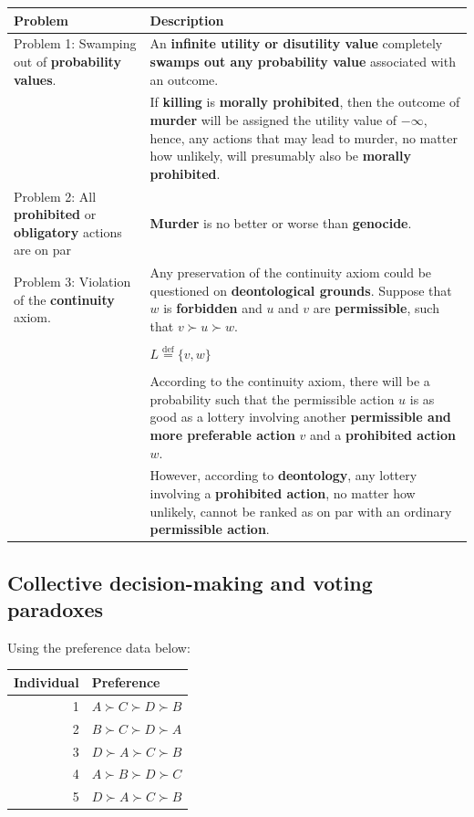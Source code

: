 \documentclass[11pt]{article}
\newcommand{\defequal}{\stackrel{\scriptscriptstyle\mathrm{def}}{=}}
\begin{document}
\begin{center}
\begin{tabular}{|m{8em}|m{30em}|}
\hline
Problem & Description\\
\hline
Problem 1: Swamping out of \textbf{probability values}. & An \textbf{infinite utility or disutility value} completely \textbf{swamps out any probability value} associated with an outcome.\\
 & If \textbf{killing} is \textbf{morally prohibited}, then the outcome of \textbf{murder} will be assigned the utility value of \(-\infty\), hence, any actions that may lead to murder, no matter how unlikely, will presumably also be \textbf{morally prohibited}.\\
\hline
Problem 2: All \textbf{prohibited} or \textbf{obligatory} actions are on par & \textbf{Murder} is no better or worse than \textbf{genocide}.\\
\hline
Problem 3: Violation of the \textbf{continuity} axiom. & Any preservation of the continuity axiom could be questioned on \textbf{deontological grounds}. Suppose that \(w\) is \textbf{forbidden} and \(u\) and \(v\) are \textbf{permissible}, such that \(v \succ u \succ w\).\\
 & \\
 & \(L \defequal \{v, w\}\)\\
 & \\
 & According to the continuity axiom, there will be a probability such that the permissible action \(u\) is as good as a lottery involving another \textbf{permissible and more preferable action} \(v\) and a \textbf{prohibited action} \(w\).\\
 & However, according to \textbf{deontology}, any lottery involving a \textbf{prohibited action}, no matter how unlikely, cannot be ranked as on par with an ordinary \textbf{permissible action}.\\
\hline
\end{tabular}
\end{center}
 \newpage
\subsection{Collective decision-making and voting paradoxes}
\label{sec:org7ae8f16}
Using the preference data below:
\begin{center}
\begin{tabular}{r|l}
Individual & Preference\\
\hline
1 & \(A \succ C \succ D \succ B\)\\
2 & \(B \succ C \succ D \succ A\)\\
3 & \(D \succ A \succ C \succ B\)\\
4 & \(A \succ B \succ D \succ C\)\\
5 & \(D \succ A \succ C \succ B\)\\
\end{tabular}
\end{center}
\end{document}
